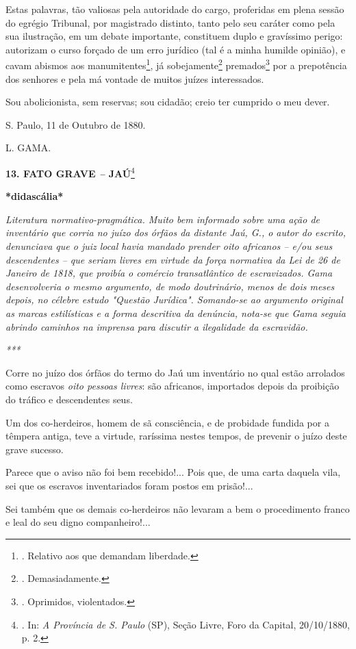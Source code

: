 Estas palavras, tão valiosas pela autoridade do cargo, proferidas em
plena sessão do egrégio Tribunal, por magistrado distinto, tanto pelo
seu caráter como pela sua ilustração, em um debate importante,
constituem duplo e gravíssimo perigo: autorizam o curso forçado de um
erro jurídico (tal é a minha humilde opinião), e cavam abismos aos
manumitentes\footnote{. Relativo aos que demandam liberdade.}, já
sobejamente\footnote{. Demasiadamente.} premados\footnote{. Oprimidos,
  violentados.} por a
prepotência dos senhores e pela má vontade de muitos juízes
interessados.

Sou abolicionista, sem reservas; sou cidadão; creio ter cumprido o meu
dever.

S. Paulo, 11 de Outubro de 1880.

L. GAMA.

\textbf{13. FATO GRAVE \emph{--} JAÚ}\footnote{. In: \emph{A Província
  de S. Paulo} (SP), Seção Livre, Foro da Capital, 20/10/1880, p. 2.}

\textbf{*didascália*}

\emph{Literatura normativo-pragmática. Muito bem informado sobre uma
ação de inventário que corria no juízo dos órfãos da distante Jaú, G., o
autor do escrito, denunciava que o juiz local havia mandado prender oito
africanos -- e/ou seus descendentes -- que seriam livres em virtude da
força normativa da Lei de 26 de Janeiro de 1818, que proibía o comércio
transatlântico de escravizados. Gama desenvolveria o mesmo argumento, de
modo doutrinário, menos de dois meses depois, no célebre estudo "Questão
Jurídica". Somando-se ao argumento original as marcas estilísticas e a
forma descritiva da denúncia, nota-se que Gama seguia abrindo caminhos
na imprensa para discutir a ilegalidade da escravidão. }

\emph{***}

Corre no juízo dos órfãos do termo do Jaú um inventário no qual estão
arrolados como escravos \emph{oito pessoas livres}: são africanos,
importados depois da proibição do tráfico e descendentes seus.

Um dos co-herdeiros, homem de sã consciência, e de probidade fundida por
a têmpera antiga, teve a virtude, raríssima nestes tempos, de prevenir o
juízo deste grave sucesso.

Parece que o aviso não foi bem recebido!... Pois que, de uma carta
daquela vila, sei que os escravos inventariados foram postos em
prisão!...

Sei também que os demais co-herdeiros não levaram a bem o procedimento
franco e leal do seu digno companheiro!...

